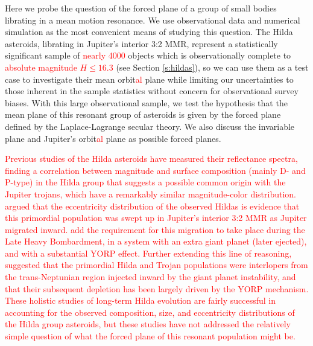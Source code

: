 \documentclass[a4paper,fleqn]{cas-sc}
\begin{document}
\begin{linenumbers}
Here we probe the question of the forced plane of a group of small bodies librating in a mean motion resonance.
We use observational data and numerical simulation as the most convenient means of studying this question.
The Hilda asteroids, librating in Jupiter's interior 3:2 MMR, represent a statistically significant sample of \textcolor{red}{nearly 4000} objects which is observationally complete to \textcolor{red}{absolute magnitude $H\leq16.3$} (see Section \ref{s:hildas}), so we can use them as a test case to investigate their mean orbit\textcolor{red}{al} plane while limiting our uncertainties to those inherent in the sample statistics without concern for observational survey biases.
With this large observational sample, we test the hypothesis that the mean plane of this resonant group of asteroids is given by the forced plane defined by the Laplace-Lagrange secular theory.
We also discuss the invariable plane and Jupiter's orbit\textcolor{red}{al} plane as possible forced planes.

\textcolor{red}{Previous studies of the Hilda asteroids have measured their reflectance spectra, finding a correlation between magnitude and surface composition (mainly D- and P-type) in the Hilda group \citep{dahlgren1997study} that suggests \citep{wong2017color,wong20170} a possible common origin with the Jupiter trojans, which have a remarkably similar magnitude-color distribution.
\citet{franklin2004hilda} argued that the eccentricity distribution of the observed Hildas is evidence that this primordial population was swept up in Jupiter's interior 3:2 MMR as Jupiter migrated inward.
\citet{brovz2011did} add the requirement for this migration to take place during the Late Heavy Bombardment, in a system with an extra giant planet (later ejected), and with a substantial YORP effect.
Further extending this line of reasoning, \citet{vokrouhlicky2016capture} suggested that the primordial Hilda and Trojan populations were interlopers from the trans-Neptunian region injected inward by the giant planet instability, and that their subsequent depletion has been largely driven by the YORP mechanism.
These holistic studies of long-term Hilda evolution are fairly successful in accounting for the observed composition, size, and eccentricity distributions of the Hilda group asteroids, but these studies have not addressed the relatively simple question of what the forced plane of this resonant population might be.}


\end{linenumbers}
\end{document}
